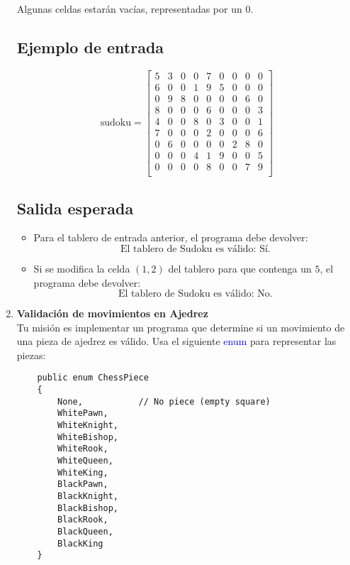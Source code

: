 \begin{enumerate}
    Algunas celdas estarán vacías, representadas por un \(0\).

    \subsection*{Ejemplo de entrada}
    \[
    \text{sudoku} = 
    \begin{bmatrix}
    5 & 3 & 0 & 0 & 7 & 0 & 0 & 0 & 0 \\
    6 & 0 & 0 & 1 & 9 & 5 & 0 & 0 & 0 \\
    0 & 9 & 8 & 0 & 0 & 0 & 0 & 6 & 0 \\
    8 & 0 & 0 & 0 & 6 & 0 & 0 & 0 & 3 \\
    4 & 0 & 0 & 8 & 0 & 3 & 0 & 0 & 1 \\
    7 & 0 & 0 & 0 & 2 & 0 & 0 & 0 & 6 \\
    0 & 6 & 0 & 0 & 0 & 0 & 2 & 8 & 0 \\
    0 & 0 & 0 & 4 & 1 & 9 & 0 & 0 & 5 \\
    0 & 0 & 0 & 0 & 8 & 0 & 0 & 7 & 9 \\
    \end{bmatrix}
    \]
    \subsection*{Salida esperada}

    \begin{itemize}
        \item Para el tablero de entrada anterior, el programa debe devolver:
        \[
        \text{El tablero de Sudoku es válido: Sí.}
        \]
        \item Si se modifica la celda \((1,2)\) del tablero para que contenga un \(5\), el programa debe devolver:
        \[
        \text{El tablero de Sudoku es válido: No.}
        \]
    \end{itemize}

    \item \textbf{Validación de movimientos en Ajedrez}\\
    Tu misión es implementar un programa que determine si un movimiento de una pieza de ajedrez es válido. Usa el siguiente \textcolor{blue}{enum} para representar las piezas:

    \begin{lstlisting}
    public enum ChessPiece
    {
        None,           // No piece (empty square)
        WhitePawn,
        WhiteKnight,
        WhiteBishop,
        WhiteRook,
        WhiteQueen,
        WhiteKing,
        BlackPawn,
        BlackKnight,
        BlackBishop,
        BlackRook,
        BlackQueen,
        BlackKing
    }
    \end{lstlisting}


\end{enumerate}
